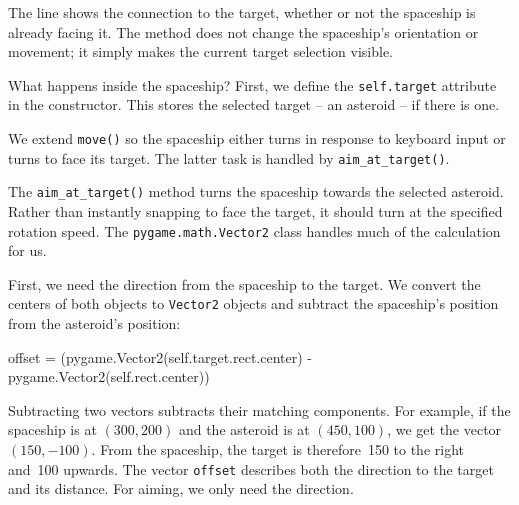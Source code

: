The line shows the connection to the target, whether or not the spaceship is already facing it. The method does not change the spaceship's orientation or movement; it simply makes the current target selection visible.


What happens inside the spaceship? First, we define the \texttt{self.target} attribute in the constructor. This stores the selected target -- an asteroid -- if there is one.


We extend \texttt{move()} so the spaceship either turns in response to keyboard input or turns to face its target. The latter task is handled by \texttt{aim\_at\_target()}.


The \texttt{aim\_at\_target()} method turns the spaceship towards the selected asteroid. Rather than instantly snapping to face the target, it should turn at the specified rotation speed. The \texttt{pygame.math.Vector2} class handles much of the calculation for us.

First, we need the direction from the spaceship to the target. We convert the centers of both objects to \texttt{Vector2} objects and subtract the spaceship's position from the asteroid's position:
\begin{codebox}
	offset = (pygame.Vector2(self.target.rect.center) - pygame.Vector2(self.rect.center))
\end{codebox}

Subtracting two vectors subtracts their matching components. For example, if the spaceship is at $(300,200)$ and the asteroid is at $(450,100)$, we get the vector $(150,-100)$. From the spaceship, the target is therefore~\SI{150}{\pixel} to the right and~\SI{100}{\pixel} upwards. The vector \texttt{offset} describes both the direction to the target and its distance. For aiming, we only need the direction.

